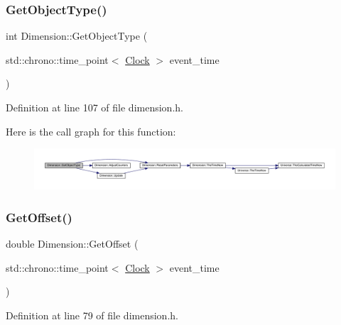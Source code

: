 \subsubsection{\texorpdfstring{Get\+Object\+Type()}{GetObjectType()}}
{\footnotesize\ttfamily int Dimension\+::\+Get\+Object\+Type (\begin{DoxyParamCaption}\item[{std\+::chrono\+::time\+\_\+point$<$ \hyperlink{universe_8h_a0ef8d951d1ca5ab3cfaf7ab4c7a6fd80}{Clock} $>$}]{event\+\_\+time }\end{DoxyParamCaption})\hspace{0.3cm}{\ttfamily [inline]}}



Definition at line 107 of file dimension.\+h.

Here is the call graph for this function\+:
\nopagebreak
\begin{figure}[H]
\begin{center}
\leavevmode
\includegraphics[width=350pt]{class_dimension_a72f494215a114cb43cecd9b170bcde51_cgraph}
\end{center}
\end{figure}
\mbox{\label{class_dimension_a58009cd435ead4b7b2f395a11fda0ae8}} 
\subsubsection{\texorpdfstring{Get\+Offset()}{GetOffset()}}
{\footnotesize\ttfamily double Dimension\+::\+Get\+Offset (\begin{DoxyParamCaption}\item[{std\+::chrono\+::time\+\_\+point$<$ \hyperlink{universe_8h_a0ef8d951d1ca5ab3cfaf7ab4c7a6fd80}{Clock} $>$}]{event\+\_\+time }\end{DoxyParamCaption})\hspace{0.3cm}{\ttfamily [inline]}}



Definition at line 79 of file dimension.\+h.

\mbox{\label{class_dimension_a6985e3d8738202530cb2cd428b5b884c}} 
